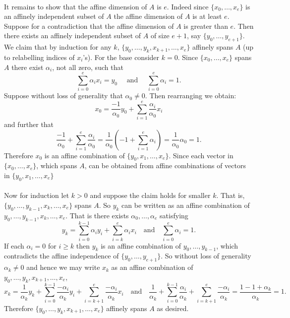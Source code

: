 \documentclass[letterpaper,12pt,oneside,onecolumn]{article}
\begin{document}
\paragraph{}
It remains to show that the affine dimension of $A$ is $e$. Indeed since $\{x_0, \dots, x_e\}$ is an affinely independent subset of $A$ the affine dimension of $A$ is at least $e$. Suppose for a contradiction that the affine dimension of $A$ is greater than $e$. Then there exists an affinely independent subset of $A$ of size $e+1$, say $\{y_0, \dots, y_{e+1}\}$. We claim that by induction for any $k$, $\{y_0, \dots, y_k, x_{k+1}, \dots, x_e\}$ affinely spans $A$ (up to relabelling indices of $x_i$'s). For the base consider $k=0$. Since $\{x_0, \dots, x_e\}$ spans $A$ there exist $\alpha_i$, not all zero, such that $$\sum_{i=0}^e \alpha_i x_i = y_0 \quad\text{ and }\quad \sum_{i=0}^e \alpha_i = 1.$$
Suppose without loss of generality that $\alpha_0 \neq 0$. Then rearranging we obtain:
$$x_0 = \frac{-1}{\alpha_0}y_0 + \sum_{i=1}^e \frac{\alpha_i}{\alpha_0} x_i$$
and further that
$$\frac{-1}{\alpha_0} + \sum_{i=1}^e \frac{\alpha_i}{\alpha_0} = \frac{1}{\alpha_0}(-1+\sum_{i=1}^e \alpha_i) = \frac{1}{\alpha_0}\alpha_0 = 1.$$
Therefore $x_0$ is an affine combination of $\{y_0, x_1, \dots, x_e\}$. Since each vector in $\{x_0, \dots, x_e\}$, which spans $A$, can be obtained from affine combinations of vectors in $\{y_0, x_1, \dots, x_e\}$ 
\paragraph{}
Now for induction let $k>0$ and suppose the claim holds for smaller $k$. That is, $\{y_0, \dots, y_{k-1}, x_k, \dots, x_e\}$ spans $A$. So $y_k$ can be written as an affine combination of $y_0, \dots, y_{k-1}, x_k, \dots, x_e$. That is there exists $\alpha_0, \dots, \alpha_e$ satisfying
$$ y_k = \sum_{i=0}^{k-1} \alpha_iy_i + \sum_{i=k}^e \alpha_ix_i \quad \text{and}\quad \sum_{i=0}^e \alpha_i=1.$$
If each $\alpha_i = 0$ for $i \geq k$ then $y_k$ is an affine combination of $y_0, \dots, y_{k-1}$, which contradicts the affine independence of $\{y_0, \dots, y_{e+1}\}$. So without loss of generality $\alpha_k \neq 0$ and hence we may write $x_k$ as an affine combination of $y_0, \dots, y_k, x_{k+1}, \dots, x_e$,
$$x_k = \frac{1}{\alpha_k}y_k+\sum_{i=0}^{k-1} \frac{-\alpha_{i}}{\alpha_k}y_i + \sum_{i=k+1}^e \frac{-\alpha_i}{\alpha_k}x_i \quad\text{and}\quad \frac{1}{\alpha_k} + \sum_{i=0}^{k-1} \frac{\alpha_i}{\alpha_k} + \sum_{i=k+1}^e \frac{-\alpha_i}{\alpha_k} = \frac{1 - 1 +\alpha_k}{\alpha_k} = 1.$$
Therefore $\{y_0, \dots, y_k, x_{k+1}, \dots, x_e\}$ affinely spans $A$ as desired.
\end{document}
